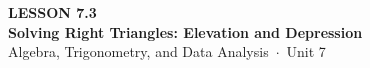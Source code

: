 \documentclass[aspectratio=169, 11pt]{beamer}
\begin{document}
{
\begin{frame}[plain]
  \vspace{2.8cm}\hspace{0.55cm}%
  \begin{minipage}{0.9\textwidth}
    {\color{goldacc}\bfseries\small LESSON 7.3}\\[0.5cm]
    {\color{white}\bfseries\LARGE Solving Right Triangles: Elevation and Depression}\\[1.2cm]
    {\color{mistmid}\small Algebra, Trigonometry, and Data Analysis~$\cdot$~Unit 7}
  \end{minipage}
\end{frame}
}

\begin{frame}[t, plain]
\end{frame}
\end{document}
